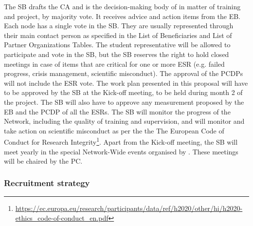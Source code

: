 The SB drafts the CA and is the decision-making body of \acronym in matter of training and project, by majority vote. 
It receives advice and action items from the EB. 
Each \acronym node has a single vote in the SB. They are usually represented through their main contact person as specified in the List of Beneficiaries and List of Partner Organizations Tables.
The student representative will be allowed to participate and vote in the SB, but the SB reserves the right to hold closed meetings in case of items that are critical for one or more ESR (e.g. failed progress, crisis management, scientific misconduct). 
The approval of the PCDPs will not include the ESR vote.
The work plan presented in this proposal will have to be approved by the SB at the Kick-off meeting, to be held during month 2 of the project. 
The SB will also have to approve any measurement proposed by the EB and the PCDP of all the ESRs.
The SB will monitor the progress of the Network, including the quality of training and supervision, and will monitor and take action on scientific misconduct as per the the The European Code of Conduct for Research Integrity\footnote{\url{https://ec.europa.eu/research/participants/data/ref/h2020/other/hi/h2020-ethics_code-of-conduct_en.pdf}}. 
Apart from the Kick-off meeting, the SB will meet yearly in the special Network-Wide events organised by \acronym. 
These meetings will be chaired by the PC.

\vspace{-2mm}
\subsubsection{Recruitment strategy}


